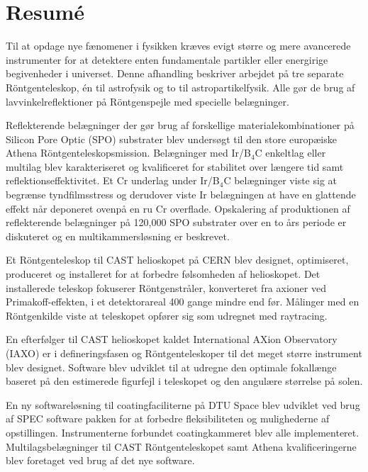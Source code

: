 \chapter{Resum\'e} %
Til at opdage nye fænomener i fysikken kræves evigt større og mere avancerede instrumenter for at detektere enten fundamentale partikler eller energirige begivenheder i universet. Denne afhandling beskriver arbejdet på tre separate Röntgenteleskop, én til astrofysik og to til astropartikelfysik. Alle gør de brug af lavvinkelreflektioner på Röntgenspejle med specielle belægninger.

Reflekterende belægninger der gør brug af forskellige materialekombinationer på Silicon Pore Optic (SPO) substrater blev undersøgt til den store europæiske Athena Röntgenteleskopsmission. Belægninger med Ir/B$_4$C enkeltlag eller multilag blev karakteriseret og kvalificeret for stabilitet over længere tid samt reflektionseffektivitet. Et Cr underlag under Ir/B$_4$C belægninger viste sig at begrænse tyndfilmsstress og derudover viste Ir belægningen at have en glattende effekt når deponeret ovenpå en ru Cr overflade. Opskalering af produktionen af reflekterende belægninger på 120,000 SPO substrater over en to års periode er diskuteret og en multikammersløsning er beskrevet.

Et Röntgenteleskop til CAST helioskopet på CERN blev designet, optimiseret, produceret og installeret for at forbedre følsomheden af helioskopet. Det installerede teleskop fokuserer Röntgenstråler, konverteret fra axioner ved Primakoff-effekten, i et detektorareal 400 gange mindre end før. Målinger med en Röntgenkilde viste at teleskopet opfører sig som udregnet med raytracing.

En efterfølger til CAST helioskopet kaldet International AXion Observatory (IAXO) er i defineringsfasen og Röntgenteleskoper til det meget større instrument blev designet. Software blev udviklet til at udregne den optimale fokallænge baseret på den estimerede figurfejl i teleskopet og den angulære størrelse på solen.

En ny softwareløsning til coatingfaciliterne på DTU Space blev udviklet ved brug af SPEC software pakken for at forbedre fleksibiliteten og mulighederne af opstillingen. Instrumenterne forbundet coatingkammeret blev alle implementeret. Multilagsbelægninger til CAST Röntgenteleskopet samt Athena kvalificeringerne blev foretaget ved brug af det nye software.

